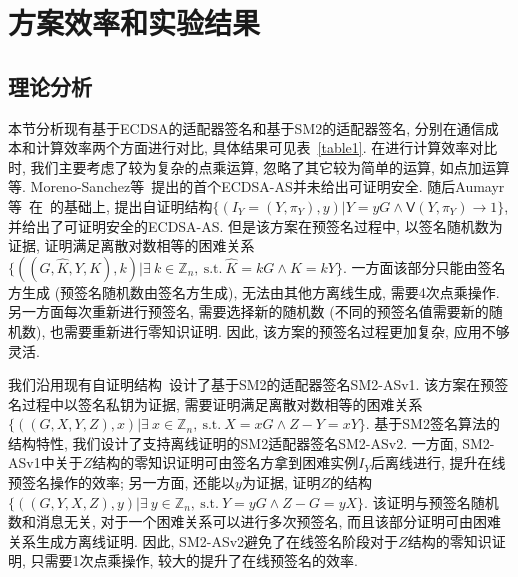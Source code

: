 \documentclass[review]{jcr}
\begin{document}
\section{方案效率和实验结果} 

\subsection{理论分析}

本节分析现有基于ECDSA的适配器签名和基于SM2的适配器签名, 分别在通信成本和计算效率两个方面进行对比, 具体结果可见表~\ref{table1}. 在进行计算效率对比时, 我们主要考虑了较为复杂的点乘运算, 忽略了其它较为简单的运算, 如点加运算等. Moreno{-}Sanchez等~\cite{PA18}提出的首个ECDSA-AS并未给出可证明安全. 随后Aumayr等~\cite{AumayrEEFHMMR20}在~\cite{PA18}的基础上, 提出自证明结构$\{(I_Y=(Y, \pi_Y), y) | Y = yG \wedge \mathsf{V}(Y, \pi_Y) \rightarrow 1\}$, 并给出了可证明安全的ECDSA-AS. 但是该方案在预签名过程中, 以签名随机数为证据, 证明满足离散对数相等的困难关系$\{((G,\hat{K},Y,K),k)|\exists\ k\in \mathbb{Z}_n,\ \text{s.t.}\ \hat{K}=kG\wedge K=kY\}$.  一方面该部分只能由签名方生成 (预签名随机数由签名方生成), 无法由其他方离线生成, 需要4次点乘操作.  另一方面每次重新进行预签名, 需要选择新的随机数 (不同的预签名值需要新的随机数), 也需要重新进行零知识证明. 因此, 该方案的预签名过程更加复杂, 应用不够灵活. 

我们沿用现有自证明结构~\cite{AumayrEEFHMMR20}设计了基于SM2的适配器签名SM2-ASv1. 该方案在预签名过程中以签名私钥为证据, 需要证明满足离散对数相等的困难关系$\{((G,X,Y,Z),x)|\exists\ x\in \mathbb{Z}_n,\ \text{s.t.}\ X=xG \wedge Z-Y=xY\}$. 基于SM2签名算法的结构特性, 我们设计了支持离线证明的SM2适配器签名SM2-ASv2. 一方面, SM2-ASv1中关于$Z$结构的零知识证明可由签名方拿到困难实例$I_Y$后离线进行, 提升在线预签名操作的效率; 另一方面, 还能以$y$为证据, 证明$Z$的结构$\{((G,Y,X,Z),y)|\exists\ y\in \mathbb{Z}_n,\ \text{s.t.}\ Y = yG \wedge Z-G = yX\}$. 该证明与预签名随机数和消息无关, 对于一个困难关系可以进行多次预签名, 而且该部分证明可由困难关系生成方离线证明. 因此, SM2-ASv2避免了在线签名阶段对于$Z$结构的零知识证明, 只需要1次点乘操作, 较大的提升了在线预签名的效率.
\end{document}
